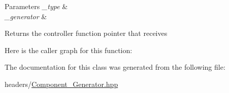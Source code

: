 \begin{DoxyParams}{Parameters}
{\em \+\_\+type} & \\
\hline
{\em \+\_\+generator} & \\
\hline
\end{DoxyParams}
\begin{DoxyReturn}{Returns}
the controller function pointer that receives 
\end{DoxyReturn}
Here is the caller graph for this function\+:


The documentation for this class was generated from the following file\+:\begin{DoxyCompactItemize}
\item 
headers/\mbox{\hyperlink{_component___generator_8hpp}{Component\+\_\+\+Generator.\+hpp}}\end{DoxyCompactItemize}
